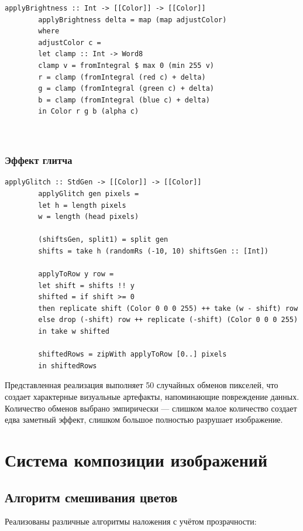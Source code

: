 \documentclass[a4paper,12pt]{article}
\begin{document}
	\begin{lstlisting}[caption=Коррекция яркости, label=lst:brightness]
		applyBrightness :: Int -> [[Color]] -> [[Color]]
		applyBrightness delta = map (map adjustColor)
		where
		adjustColor c =
		let clamp :: Int -> Word8
		clamp v = fromIntegral $ max 0 (min 255 v)
		r = clamp (fromIntegral (red c) + delta)
		g = clamp (fromIntegral (green c) + delta)
		b = clamp (fromIntegral (blue c) + delta)
		in Color r g b (alpha c)
		
		
	\end{lstlisting}
	
	\subsubsection{Эффект глитча}
	
	\begin{lstlisting}[caption=Эффект цифрового глитча, label=lst:glitch]
		applyGlitch :: StdGen -> [[Color]] -> [[Color]]
		applyGlitch gen pixels =
		let h = length pixels
		w = length (head pixels)
		
		(shiftsGen, split1) = split gen
		shifts = take h (randomRs (-10, 10) shiftsGen :: [Int])
		
		applyToRow y row =
		let shift = shifts !! y
		shifted = if shift >= 0
		then replicate shift (Color 0 0 0 255) ++ take (w - shift) row
		else drop (-shift) row ++ replicate (-shift) (Color 0 0 0 255)
		in take w shifted
		
		shiftedRows = zipWith applyToRow [0..] pixels
		in shiftedRows
	\end{lstlisting}
	
	Представленная реализация выполняет 50 случайных обменов пикселей, что создает характерные визуальные артефакты, напоминающие повреждение данных. Количество обменов выбрано эмпирически — слишком малое количество создает едва заметный эффект, слишком большое полностью разрушает изображение.
	
	
	\newpage
	\section{Система композиции изображений}

	
	\subsection{Алгоритм смешивания цветов}
	
	Реализованы различные алгоритмы наложения с учётом прозрачности:
	
\end{document}
